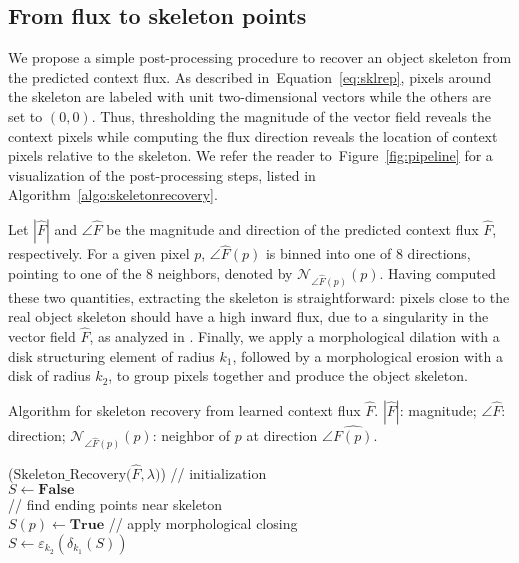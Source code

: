 \documentclass[10pt,twocolumn,letterpaper]{article}
\newcommand{\reffig}[1]{Figure~\ref{#1}}
\newcommand{\refeq}[1]{Equation~\eqref{#1}}
\begin{document}
\subsection{From flux to skeleton points} \label{sec:postprocessing}
We propose a simple post-processing procedure to recover an object skeleton from the predicted context flux.
As described in~\refeq{eq:sklrep}, pixels around the skeleton are labeled with unit two-dimensional vectors while the others are set to $(0, 0)$.
Thus, thresholding the magnitude of the vector field reveals the context pixels while
computing the flux direction reveals the location of context pixels relative to the skeleton. We refer the reader to~\reffig{fig:pipeline} for a visualization of the post-processing steps, listed in Algorithm~\ref{algo:skeletonrecovery}.

Let $|\hat{F}|$ and $\angle \hat{F}$ be the magnitude and direction of the predicted context flux $\hat{F}$, respectively.
For a given pixel $p$, $\angle \hat{F}(p)$ is binned into one of 8 directions, pointing to one of the 8 neighbors, denoted by $\mathcal{N}_{\angle \hat{F}(p)}(p)$.
Having computed these two quantities, extracting the skeleton is straightforward:
pixels close to the real object skeleton should have a high inward flux, due to a singularity in the vector field $\hat{F}$, as analyzed in \cite{dimitrov2003}.
Finally, we apply a morphological dilation with a disk structuring element of radius $k_1$, followed by a morphological erosion with a disk of radius $k_2$, to group pixels together and produce the object skeleton.

\begin{algorithm}[t]
\caption{Algorithm for skeleton recovery from learned context flux $\hat{F}$. $|\hat{F}|$: magnitude; $\angle \hat{F}$: direction; $\mathcal{N}_{\angle \hat{F}(p)}(p)$: neighbor of $p$ at direction $\angle \hat{F(p)}$.}
\label{algo:skeletonrecovery}
\DontPrintSemicolon

\Begin($\text{Skeleton\_Recovery} {(} \hat{F}, \lambda {)}$)
{
    // initialization \\
    $S \gets \textbf{False}$ \\
    // find ending points near skeleton \\
    {
        {
        	$S(p) \gets \textbf{True}$
        }
    }
    // apply morphological closing \\
    $S \gets \varepsilon_{k_2}(\delta_{k_1}(S))$ \;
     \;
}
\end{algorithm}
\end{document}
